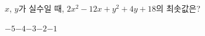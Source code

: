 $x$, $y$가 실수일 때, $2x^2-12x+y^2+4y+18$의 최솟값은?
\begin{choices32}{$-5$}{$-4$}{$-3$}{$-2$}{$-1$}\end{choices32}
